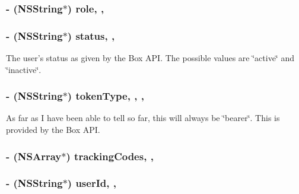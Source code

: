 \hypertarget{interface_m_b_user_acd96026ab462f1abd3a9eee81d2cd1e2}{
\subsubsection[{role}]{\setlength{\rightskip}{0pt plus 5cm}-\/ (N\-S\-String$\ast$) role\hspace{0.3cm}{\ttfamily [read]}, {\ttfamily [nonatomic]}, {\ttfamily [strong]}}}\label{interface_m_b_user_acd96026ab462f1abd3a9eee81d2cd1e2}
\hypertarget{interface_m_b_user_ac2acf327011ce6ed9e26a41ceddaee31}{
\subsubsection[{status}]{\setlength{\rightskip}{0pt plus 5cm}-\/ (N\-S\-String$\ast$) status\hspace{0.3cm}{\ttfamily [read]}, {\ttfamily [nonatomic]}, {\ttfamily [strong]}}}\label{interface_m_b_user_ac2acf327011ce6ed9e26a41ceddaee31}
The user's status as given by the Box A\-P\-I. The possible values are \char`\"{}active\char`\"{} and \char`\"{}inactive\char`\"{}. \hypertarget{interface_m_b_user_aebb1b1ab373299d1bbcb8edacfc117c2}{
\subsubsection[{token\-Type}]{\setlength{\rightskip}{0pt plus 5cm}-\/ (N\-S\-String$\ast$) token\-Type\hspace{0.3cm}{\ttfamily [read]}, {\ttfamily [write]}, {\ttfamily [nonatomic]}, {\ttfamily [strong]}}}\label{interface_m_b_user_aebb1b1ab373299d1bbcb8edacfc117c2}
As far as I have been able to tell so far, this will always be \char`\"{}bearer\char`\"{}. This is provided by the Box A\-P\-I. \hypertarget{interface_m_b_user_a2268ce10a4634da2a0f27e6eb1fd8a88}{
\subsubsection[{tracking\-Codes}]{\setlength{\rightskip}{0pt plus 5cm}-\/ (N\-S\-Array$\ast$) tracking\-Codes\hspace{0.3cm}{\ttfamily [read]}, {\ttfamily [nonatomic]}, {\ttfamily [strong]}}}\label{interface_m_b_user_a2268ce10a4634da2a0f27e6eb1fd8a88}
\hypertarget{interface_m_b_user_a25211835b4b5dff492e975e6231df626}{
\subsubsection[{user\-Id}]{\setlength{\rightskip}{0pt plus 5cm}-\/ (N\-S\-String$\ast$) user\-Id\hspace{0.3cm}{\ttfamily [read]}, {\ttfamily [nonatomic]}, {\ttfamily [strong]}}}\label{interface_m_b_user_a25211835b4b5dff492e975e6231df626}



